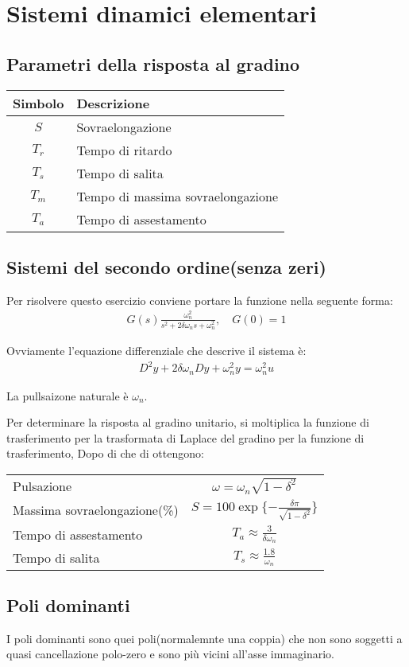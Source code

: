 \chapter{Sistemi dinamici elementari}

\section{Parametri della risposta al gradino}
\begin{center}
\renewcommand{\arraystretch}{1.5}
  \begin{tabular}{|c|l|}
  \hline
    Simbolo & Descrizione \\
  \hline
    $S$ & Sovraelongazione \\
    $T_r$ & Tempo di ritardo \\
    $T_s$ & Tempo di salita \\
    $T_m$ & Tempo di massima sovraelongazione  \\
    $T_a$ & Tempo di assestamento  \\
  \hline

  \end{tabular}
\end{center}


\section{Sistemi del secondo ordine(senza zeri)}
Per risolvere questo esercizio conviene portare la funzione nella seguente forma:
\begin{align}
  G(s) \frac{\omega_n^2}{s^2+2\delta\omega_ns+\omega_n^2}, \quad G(0)=1
\end{align}

Ovviamente l'equazione differenziale che descrive il sistema è:
\begin{align}
  D^2y + 2\delta\omega_nDy+\omega_n^2y = \omega_n^2u
\end{align}

La pullsaizone naturale è $\omega_n$.

Per determinare la risposta al gradino unitario, si moltiplica la funzione di trasferimento per la trasformata di Laplace del gradino per la funzione di trasferimento,
Dopo di che di ottengono:

\begin{center}
\renewcommand{\arraystretch}{1.5}
  \begin{tabular}{|l|c|}
    \hline
      Pulsazione & $\omega = \omega_n\sqrt{1-\delta^2}$ \\
      Massima sovraelongazione(\%) & $S = 100 \exp\{- \frac{\delta \pi}{\sqrt{1 - \delta^2}}\}$ \\
      Tempo di assestamento & $T_a \approx \frac{3}{\delta \omega_n}$ \\
      Tempo di salita & $T_s \approx \frac{1.8}{\omega_n}$ \\
    \hline
  \end{tabular}
\end{center}


\section{Poli dominanti}
I poli dominanti sono quei poli(normalemnte una coppia) che non sono soggetti a quasi cancellazione 
polo-zero e sono più vicini all'asse immaginario.
